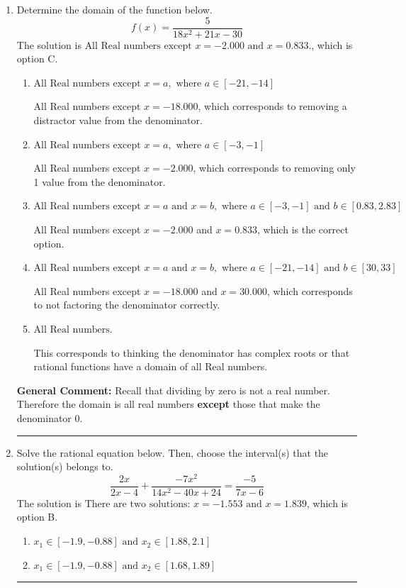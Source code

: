 \documentclass{extbook}[14pt]
\newcommand{\litem}[1]{\item #1

\rule{\textwidth}{0.4pt}}
\begin{document}
\begin{enumerate}\litem{
Determine the domain of the function below.
\[ f(x) = \frac{5}{18x^{2} +21 x -30} \]The solution is \( \text{All Real numbers except } x = -2.000 \text{ and } x = 0.833. \), which is option C.\begin{enumerate}[label=\Alph*.]
\item \( \text{All Real numbers except } x = a, \text{ where } a \in [-21, -14] \)

All Real numbers except $x = -18.000$, which corresponds to removing a distractor value from the denominator.
\item \( \text{All Real numbers except } x = a, \text{ where } a \in [-3, -1] \)

All Real numbers except $x = -2.000$, which corresponds to removing only 1 value from the denominator.
\item \( \text{All Real numbers except } x = a \text{ and } x = b, \text{ where } a \in [-3, -1] \text{ and } b \in [0.83, 2.83] \)

All Real numbers except $x = -2.000$ and $x = 0.833$, which is the correct option.
\item \( \text{All Real numbers except } x = a \text{ and } x = b, \text{ where } a \in [-21, -14] \text{ and } b \in [30, 33] \)

All Real numbers except $x = -18.000$ and $x = 30.000$, which corresponds to not factoring the denominator correctly.
\item \( \text{All Real numbers.} \)

This corresponds to thinking the denominator has complex roots or that rational functions have a domain of all Real numbers.
\end{enumerate}

\textbf{General Comment:} Recall that dividing by zero is not a real number. Therefore the domain is all real numbers \textbf{except} those that make the denominator 0.
}
\litem{
Solve the rational equation below. Then, choose the interval(s) that the solution(s) belongs to.
\[ \frac{2x}{2x -4} + \frac{-7x^{2}}{14x^{2} -40 x + 24} = \frac{-5}{7x -6} \]The solution is \( \text{There are two solutions: } x = -1.553 \text{ and } x = 1.839 \), which is option B.\begin{enumerate}[label=\Alph*.]
\item \( x_1 \in [-1.9, -0.88] \text{ and } x_2 \in [1.88,2.1] \)


\item \( x_1 \in [-1.9, -0.88] \text{ and } x_2 \in [1.68,1.89] \)


\end{enumerate}}
\end{enumerate}
\end{document}
